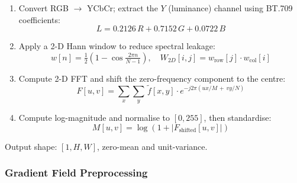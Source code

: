 \documentclass[12pt, a4paper]{article}
\begin{document}
\begin{enumerate}[leftmargin=*, label=\arabic*.]
  \item Convert RGB $\rightarrow$ YCbCr; extract the $Y$ (luminance) channel
        using BT.709 coefficients:
        \begin{equation}
          L = 0.2126\,R + 0.7152\,G + 0.0722\,B
          \label{eq:bt709}
        \end{equation}
  \item Apply a 2-D Hann window to reduce spectral leakage:
        \begin{equation}
          w[n] = \tfrac{1}{2}\!\left(1 - \cos\!\tfrac{2\pi n}{N-1}\right), \quad
          W_{2D}[i,j] = w_{\mathrm{row}}[j]\cdot w_{\mathrm{col}}[i]
          \label{eq:hann}
        \end{equation}
  \item Compute 2-D FFT and shift the zero-frequency component to the centre:
        \begin{equation}
          F[u,v] = \sum_{x}\sum_{y}\,\tilde{f}[x,y]\cdot
          e^{-j2\pi(ux/M\,+\,vy/N)}
          \label{eq:fft}
        \end{equation}
  \item Compute log-magnitude and normalise to $[0,255]$, then standardise:
        \begin{equation}
          M[u,v] = \log\!\left(1 + \left|F_{\mathrm{shifted}}[u,v]\right|\right)
          \label{eq:logmag}
        \end{equation}
\end{enumerate}

Output shape: $[1, H, W]$, zero-mean and unit-variance.

\subsubsection{Gradient Field Preprocessing}
\end{document}
